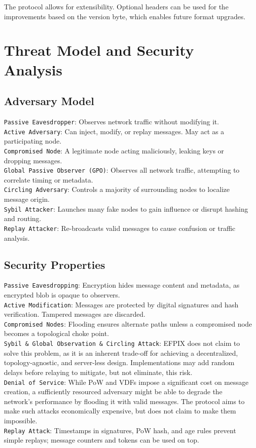 \documentclass{article}
\begin{document}
The protocol allows for extensibility. Optional headers can be used for the improvements based on the version byte, which enables future format upgrades. 

\section{Threat Model and Security Analysis}

\subsection{Adversary Model}

\texttt{Passive Eavesdropper}: Observes network traffic without modifying it.\\
\texttt{Active Adversary}: Can inject, modify, or replay messages. May act as a participating node.\\
\texttt{Compromised Node}: A legitimate node acting maliciously, leaking keys or dropping messages.\\
\texttt{Global Passive Observer (GPO)}: Observes all network traffic, attempting to correlate timing or metadata.\\
\texttt{Circling Adversary}: Controls a majority of surrounding nodes to localize message origin.\\
\texttt{Sybil Attacker}: Launches many fake nodes to gain influence or disrupt hashing and routing.\\
\texttt{Replay Attacker}: Re-broadcasts valid messages to cause confusion or traffic analysis.

\subsection{Security Properties}

\texttt{Passive Eavesdropping}: Encryption hides message content and metadata, as encrypted blob is opaque to observers. \\
\texttt{Active Modification}: Messages are protected by digital signatures and hash verification. Tampered messages are discarded. \\
\texttt{Compromised Nodes}: Flooding ensures alternate paths unless a compromised node becomes a topological choke point. \\
\texttt{Sybil \& Global Observation \& Circling Attack}: EFPIX does not claim to solve this problem, as it is an inherent trade-off for achieving a decentralized, topology-agnostic, and server-less design. Implementations may add random delays before relaying to mitigate, but not eliminate, this risk. \\
\texttt{Denial of Service}: While PoW and VDFs impose a significant cost on message creation, a sufficiently resourced adversary might be able to degrade the network's performance by flooding it with valid messages. The protocol aims to make such attacks economically expensive, but does not claim to make them impossible.\\
\texttt{Replay Attack}: Timestamps in signatures, PoW hash, and age rules prevent simple replays; message counters and tokens can be used on top.
\end{document}
